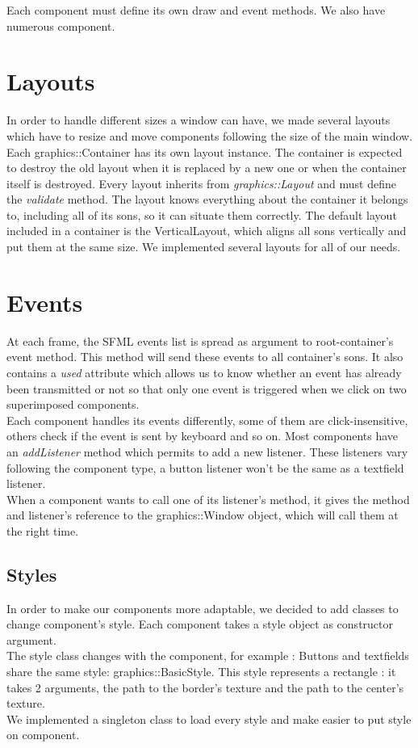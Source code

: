 \documentclass{scrreprt}
\begin{document}
			Each component must define its own draw and event methods.
			We also have numerous component.

		  \section{Layouts}
		  In order to handle different sizes a window can have, we made several layouts which have to resize and move components following the size of the main window. Each graphics::Container has its own layout instance. The container is expected to destroy the old layout when it is replaced by a new one or when the container itself is destroyed. Every layout inherits from \emph{graphics::Layout} and must define the \emph{validate} method. 
		  The layout knows everything about the container it belongs to, including all of its sons, so it can situate them correctly.
	The default layout included in a container is the VerticalLayout, which aligns all sons vertically and put them at the same size.
We implemented several layouts for all of our needs.

	\section{Events}
	At each frame, the SFML events list is spread as argument to root-container's event method. This method will send these events to all container's sons. It also contains a \emph{used} attribute which allows us to know whether an event has already been transmitted or not so that only one event is triggered when we click on two superimposed components.\\

	Each component handles its events differently, some of them are click-insensitive, others check if the event is sent by keyboard and so on.
	Most components have an \emph{addListener} method which permits to add a new listener. These listeners vary following the component type, a button listener won't be the same as a textfield listener.\\

	When a component wants to call one of its listener's method, it gives the method and listener's reference to the graphics::Window object, which will call them at the right time.

	\subsection{Styles}
	In order to make our components more adaptable, we decided to add classes to change component's style. Each component takes a style object as constructor argument.\\
	The style class changes with the component, for example : Buttons and textfields share the same style: graphics::BasicStyle. This style represents a rectangle : it takes 2 arguments, the path to the border's texture and the path to the center's texture.\\
	We implemented a singleton class to load every style and make easier to put style on component. 
\end{document}
